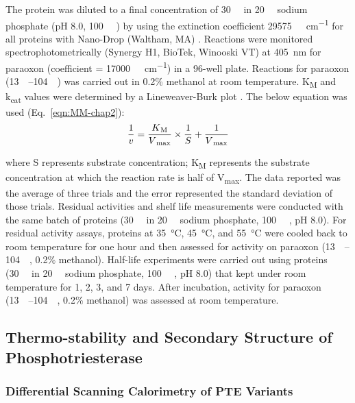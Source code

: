 \begin{refsection}
The protein was diluted to a final concentration of \SI{30}{\nano\Molar} in
\SI{20}{\milli\Molar} sodium phosphate (pH 8.0, \SI{100}{\micro\Molar}
) by using the extinction coefficient \SI{29575}{\per\Molar\per\cm}
for all proteins with Nano-Drop (Waltham, MA) \cite{Gasteiger2005, Pace1995}.
Reactions were monitored spectrophotometrically (Synergy H1, BioTek, Winooski
VT) at \SI{405}{\nm} for paraoxon (coefficient = \SI{17000}{\per\Molar\per\cm})
\cite{Baker2011b} in a 96-well plate. Reactions for paraoxon
(\SIrange{13}{104}{\micro\Molar}) was carried out in 0.2\% methanol at room
temperature.  K\textsubscript{M} and k\textsubscript{cat} values were
determined by a Lineweaver-Burk plot \cite{Baker2011b}. The below equation was used
(Eq.~\ref{eqn:MM-chap2}):
\begin{equation} 
    \frac{1}{v} =
    \frac{K\textsubscript{M}}{V\textsubscript{max}}\times\frac{1}{S} +
    \frac{1}{V\textsubscript{max}} 
    \label{eqn:MM-chap2}
\end{equation}

where S represents substrate concentration; K\textsubscript{M} represents the
substrate concentration at which the reaction rate is half of
V\textsubscript{max}. The data reported was the average of three trials and the
error represented the standard deviation of those trials. Residual activities
and shelf life measurements were conducted with the same batch of proteins
(\SI{30}{\nano\Molar} in \SI{20}{\milli\Molar} sodium phosphate, \SI{100}{\micro\Molar}
, pH 8.0). For residual activity assays, proteins at
\SI{35}{\celsius}, \SI{45}{\celsius}, and \SI{55}{\celsius} were cooled back to
room temperature for one hour and then assessed for activity on paraoxon
(\SIrange{13}{104}{\micro\Molar}, 0.2\% methanol).  Half-life experiments were
carried out using proteins (\SI{30}{\nano\Molar} in \SI{20}{\milli\Molar}
sodium phosphate, \SI{100}{\micro\Molar} , pH 8.0) that kept under
room temperature for
1, 2, 3, and 7 days. After incubation, activity for paraoxon
(\SIrange{13}{104}{\micro\Molar}, 0.2\% methanol) was assessed at room
temperature. 

\subsection{Thermo-stability and Secondary Structure of Phosphotriesterase}

\subsubsection{Differential Scanning Calorimetry of PTE Variants}


\end{refsection}
